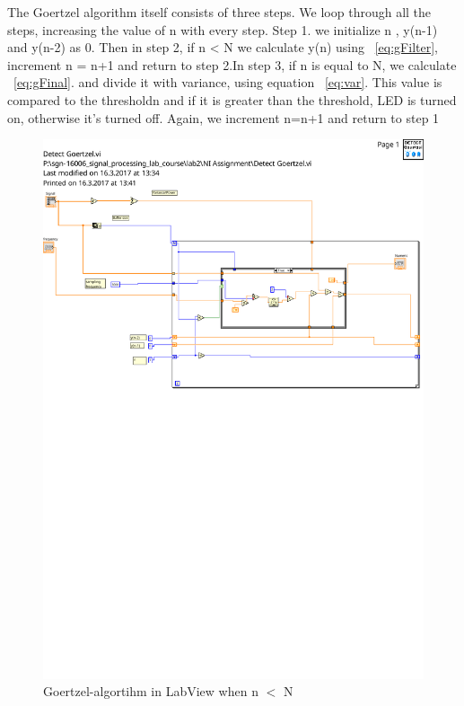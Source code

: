 The Goertzel algorithm itself consists of three steps. We loop through all the steps, increasing the value of n with every step. Step 1. we initialize n , y(n-1) and y(n-2) as 0. Then in step 2, if n < N we calculate y(n) using ~\ref{eq:gFilter}, increment n = n+1 and return to step 2.In step 3, if n  is equal to N,  we calculate ~\ref{eq:gFinal}. and divide it with variance, using equation ~\ref{eq:var}.
This value is compared to the thresholdn and if it is greater than the threshold, LED is turned on, otherwise it's turned off. Again, we increment n=n+1 and return to step 1


\begin{figure}[H]
  \centering
  \includegraphics[width=0.8\linewidth]{detect_goertzel_true}
  \caption{Goertzel-algortihm in LabView when n $<$ N}
\label{fig:GoertzelTrue}
\end{figure}


